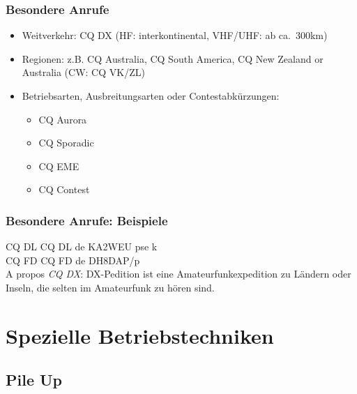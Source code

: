 \begin{frame}
    \frametitle{Besondere Anrufe}

    \begin{itemize}
        \item Weitverkehr: CQ DX (HF: interkontinental, VHF/UHF: ab ca.~300km)
        \item Regionen: z.B. CQ Australia, CQ South America, CQ New Zealand or
              Australia (CW: CQ VK/ZL)
        \item Betriebsarten, Ausbreitungsarten oder Contestabkürzungen:
        \begin{itemize}
            \item CQ Aurora
            \item CQ Sporadic
            \item CQ EME
            \item CQ Contest
        \end{itemize}
    \end{itemize}
\end{frame}

\begin{frame}
    \frametitle{Besondere Anrufe: Beispiele}

    CQ DL CQ DL de KA2WEU pse k \\[2em]

    CQ FD CQ FD de DH8DAP/p \\[2em]

    A propos \emph{CQ DX}: DX-Pedition ist eine Amateurfunkexpedition zu Ländern
    oder Inseln, die selten im Amateurfunk zu hören sind.

\end{frame}

\section{Spezielle Betriebstechniken}

\subsection{Pile Up}

